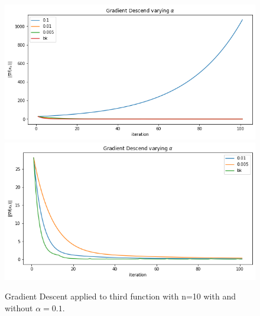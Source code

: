 \documentclass[a4paper,10pt]{report}
\begin{document}
\begin{figure}[!htb]
    \includegraphics[width=\linewidth]{3_a_n10_1.png}
  \endminipage\hfill
    \includegraphics[width=\linewidth]{3_a_n10_2.png}
  \endminipage\hfill
  \caption{Gradient Descent applied to third function with n=10 with and without $\alpha=0.1$.}
  \label{fig:3_n10}
\end{figure}
\end{document}
